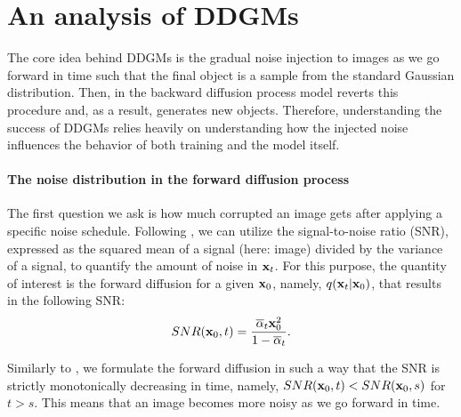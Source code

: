 
\section{An analysis of DDGMs \label{sec:analysis}}

The core idea behind DDGMs is the gradual noise injection to images as we go forward in time such that the final object is a sample from the standard Gaussian distribution. Then, in the backward diffusion process model reverts this procedure and, as a result, generates new objects. Therefore, understanding the success of DDGMs relies heavily on understanding how the injected noise influences the behavior of both training and the model itself.

\paragraph{The noise distribution in the forward diffusion process} The first question we ask is how much corrupted an image gets after applying a specific noise schedule. Following %
\cite{ho2020denoising, kingma2014autoencoding, nichol2021improved}, we can utilize the signal-to-noise ratio (SNR), expressed as the squared mean of a signal (here: image) divided by the variance of a signal, to quantify the amount of noise in ${\mathbf{x}}_t$. For this purpose, the quantity of interest is the forward diffusion for a given ${\mathbf{x}}_0$, namely, $q({\mathbf{x}}_t | {\mathbf{x}}_0)$, that results in the following SNR:
\begin{equation}\label{eq:snr}
    SNR(\rvx_0, t) = \frac{\overline{\alpha}_t \rvx_0^2}{1 - \overline{\alpha}_t} .
\end{equation}

Similarly to \cite{kingma2021variational}, we formulate the forward diffusion in such a way that the SNR is strictly monotonically decreasing in time, namely, $SNR({\mathbf{x}}_0, t) < SNR({\mathbf{x}}_0, s)$ for $t > s$. This means that an image becomes more noisy as we go forward in time. 

